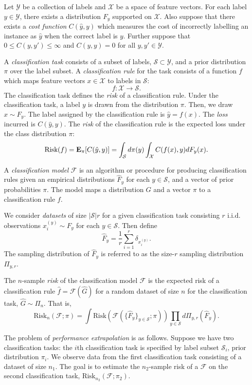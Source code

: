 \documentclass[12pt]{article}
\begin{document}
Let $\mathcal{Y}$ be a collection of labels and $\mathcal{X}$ be a
space of feature vectors.  For each label $y \in \mathcal{Y}$, there
exists a distribution $F_y$ supported on $\mathcal{X}$.  Also suppose
that there exists a \emph{cost function} $C(\hat{y}, y)$ which
measures the cost of incorrectly labelling an instance as $\hat{y}$
when the correct label is $y$.  Further suppose that $0 \leq C(y, y')
\leq \infty$ and $C(y, y)=0$ for all $y, y' \in \mathcal{Y}$.

A \emph{classification task} consists of a subset of labels,
$\mathcal{S} \subset \mathcal{Y}$, and a prior distribution $\pi$ over
the label subset.  A \emph{classification rule} for the task consists
of a function $f$ which maps feature vectors $x \in \mathcal{X}$ to
labels in $\mathcal{S}$:
\[
f: \mathcal{X} \to \mathcal{S}.
\]
The classification task defines the \emph{risk} of a classification
rule.  Under the classification task, a label $y$ is drawn from the
distribution $\pi$.  Then, we draw $x \sim F_y$.  The label assigned
by the classification rule is $\hat{y} = f(x)$.  The \emph{loss}
incurred is $C(\hat{y}, y)$.  The \emph{risk} of the classification
rule is the expected loss under the class distribution $\pi$:
\[
\text{Risk}(f) = \textbf{E}_\pi[C(\hat{y}, y)] = \int_\mathcal{S} d \pi(y) \int_{\mathcal{X}} C(f(x), y) dF_y(x).
\]

A \emph{classification model} $\mathcal{F}$ is an algorithm or
procedure for producing classification rules given an empirical
distributions $\hat{F}_y$ for each $y \in \mathcal{S}$, and a vector
of prior probabilities $\pi$.  The model maps a distribution $G$ and a
vector $\pi$ to a classification rule $f$.

We consider \emph{datasets} of size $|\mathcal{S}|r$ for a given
classification task consisting $r$ i.i.d. observations $x_i^{(y)} \sim
F_y$ for each $y \in \mathcal{S}$.  Then define 
\[\hat{F}_y = \frac{1}{r}\sum_{i=1}^r \delta_{x_i^{(y)}}.\]
The sampling distribution of $\hat{F}_y$ is referred to as the
size-$r$ sampling distribution $\Pi_{y, r}$.

The $n$-sample \emph{risk} of the classification model $\mathcal{F}$
is the expected risk of a classification rule $\hat{f} =
\mathcal{F}(\hat{G})$ for a random dataset of size $n$ for the
classification task, $\hat{G} \sim \Pi_n$.  That is,
\[
\text{Risk}_n(\mathcal{F}; \pi) =
\int \text{Risk}(\mathcal{F}(\{\hat{F}_y\}_{y \in \mathcal{S}};
\pi)) \prod_{y \in \mathcal{S}} d\Pi_{y, r}(\hat{F}_y).
\]

The problem of \emph{performance extrapolation} is as follows.
Suppose we have two classification tasks: the $i$th classification
task is specified by label subset $\mathcal{S}_i$, prior distribution
$\pi_i$.  We observe data from the first classification task
consisting of a dataset of size $n_1$.  The goal is to estimate the
$n_2$-sample risk of a $\mathcal{F}$ on the second classification
task, $\text{Risk}_{n_2}(\mathcal{F}; \pi_2)$.
\end{document}
